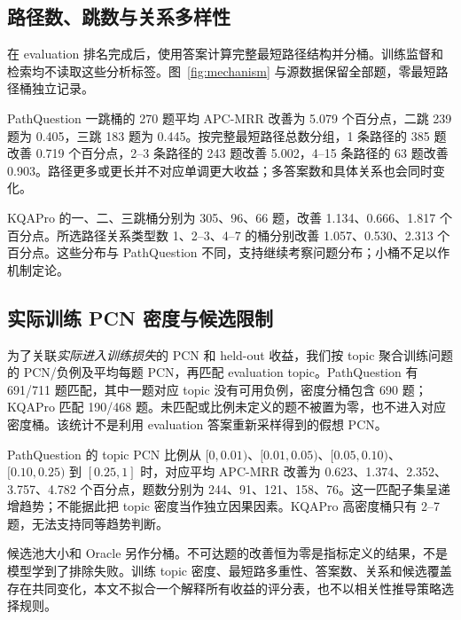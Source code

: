 \documentclass[UTF8,a4paper,10pt,fontset=fandol]{ctexart}
\begin{document}
\subsection{路径数、跳数与关系多样性}
在 evaluation 排名完成后，使用答案计算完整最短路径结构并分桶。训练监督和检索均不读取这些分析标签。图~\ref{fig:mechanism} 与源数据保留全部题，零最短路径桶独立记录。

PathQuestion 一跳桶的 270 题平均 APC-MRR 改善为 5.079 个百分点，二跳 239 题为 0.405，三跳 183 题为 0.445。按完整最短路径总数分组，1 条路径的 385 题改善 0.719 个百分点，2--3 条路径的 243 题改善 5.002，4--15 条路径的 63 题改善 0.903。路径更多或更长并不对应单调更大收益；多答案数和具体关系也会同时变化。

KQAPro 的一、二、三跳桶分别为 305、96、66 题，改善 1.134、0.666、1.817 个百分点。所选路径关系类型数 1、2--3、4--7 的桶分别改善 1.057、0.530、2.313 个百分点。这些分布与 PathQuestion 不同，支持继续考察问题分布；小桶不足以作机制定论。

\subsection{实际训练 PCN 密度与候选限制}
为了关联\emph{实际进入训练损失}的 PCN 和 held-out 收益，我们按 topic 聚合训练问题的 PCN/负例及平均每题 PCN，再匹配 evaluation topic。PathQuestion 有 691/711 题匹配，其中一题对应 topic 没有可用负例，密度分桶包含 690 题；KQAPro 匹配 190/468 题。未匹配或比例未定义的题不被置为零，也不进入对应密度桶。该统计不是利用 evaluation 答案重新采样得到的假想 PCN。

PathQuestion 的 topic PCN 比例从 $[0,0.01)$、$[0.01,0.05)$、$[0.05,0.10)$、$[0.10,0.25)$ 到 $[0.25,1]$ 时，对应平均 APC-MRR 改善为 0.623、1.374、2.352、3.757、4.782 个百分点，题数分别为 244、91、121、158、76。这一匹配子集呈递增趋势；不能据此把 topic 密度当作独立因果因素。KQAPro 高密度桶只有 2--7 题，无法支持同等趋势判断。

候选池大小和 Oracle 另作分桶。不可达题的改善恒为零是指标定义的结果，不是模型学到了排除失败。训练 topic 密度、最短路多重性、答案数、关系和候选覆盖存在共同变化，本文不拟合一个解释所有收益的评分表，也不以相关性推导策略选择规则。
\end{document}
